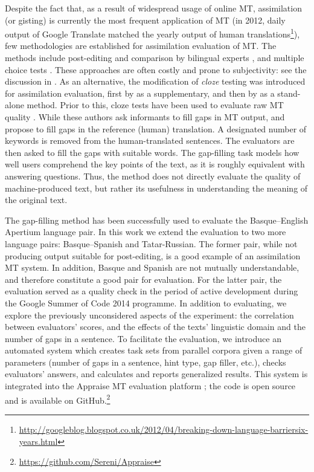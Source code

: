 \documentclass[11pt]{article}
\newcommand{\comment}[1]{}
\begin{document}
Despite the fact that, as a result of widespread usage of online MT, assimilation (or gisting) is currently the most frequent application of MT (in 2012, daily output of Google Translate matched the yearly output of human translations\footnote{\url{http://googleblog.blogspot.co.uk/2012/04/breaking-down-language-barriersix-years.html}}), few methodologies are established for assimilation evaluation of MT. The methods include post-editing and comparison by bilingual experts \citep{ginesti09},\comment{MLF: should we also cite the original WMT reference cited by Ginestí et al.?} and multiple choice tests \citep{jones07,trosterud12}. These approaches are often costly and prone to subjectivity: see the discussion in \cite{oregan13}. As an alternative, the modification of \emph{cloze}\comment{\emph{cloze} stands for \emph{closure}.} testing \citep{taylor53} was introduced for assimilation evaluation, first by \citet{trosterud12} as a supplementary, and then by \citet{oregan13} as a stand-alone method. Prior to this, cloze tests have been used to evaluate raw MT quality \citep{vanslype79,somers00}. While these authors ask informants to fill gaps in MT output, \citet{trosterud12} and \citet{oregan13} propose to fill gaps in the reference (human) translation. A designated number of keywords is removed from the human-translated sentences. The evaluators are then asked to fill the gaps with suitable words. The gap-filling task models how well users comprehend the key points of the text, as it is roughly equivalent with answering questions. Thus, the method does not directly evaluate the quality of machine-produced text, but rather its usefulness in understanding the meaning of the original text. 

The gap-filling method has been successfully used to evaluate the Basque--English Apertium language pair. In this work we extend the evaluation to two more language pairs: Basque--Spanish and Tatar-Russian. The former pair, while not producing output suitable for post-editing, is a good example of an assimilation MT system. In addition, Basque and Spanish are not mutually understandable, and therefore constitute a good pair for evaluation. For the latter pair, the evaluation served as a quality check in the period of active development during the Google Summer of Code 2014 programme. In addition to evaluating, we explore the previously unconsidered aspects of the experiment: the correlation between evaluators' scores, and the effects of the texts' linguistic domain and the number of gaps in a sentence. To facilitate the evaluation, we introduce an automated system which creates task sets from parallel corpora given a range of parameters (number of gaps in a sentence, hint type, gap filler,\comment{MLF: gap filler or gap marker?} \comment{EA: well, initially we had questions with lemmas in place of gaps, and also multiple choice questions where answer options got generated automatically. This is not used in this evaluation, but it's still in the toolkit. Should I remove?} etc.), checks evaluators' answers, and calculates and reports generalized results. This system is integrated into the Appraise MT evaluation platform \citep{federmann12}; the code is open source and is available on GitHub.\footnote{{\url{https://github.com/Sereni/Appraise}}}
\end{document}
